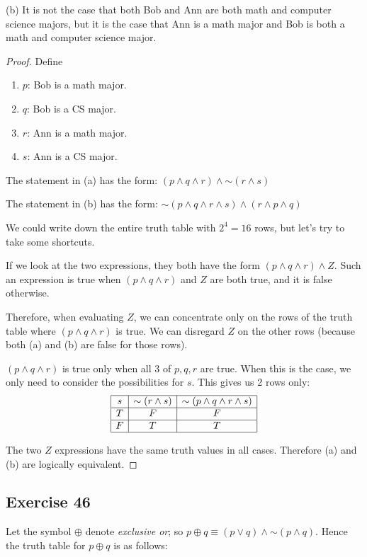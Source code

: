 \documentclass[14pt]{extarticle}
\begin{document}
(b) It is not the case that both Bob and Ann are both math and computer science majors, but it is the case that Ann is a math major and Bob is both a math and computer science major.

\begin{proof} Define
\begin{enumerate}
\item $p$: Bob is a math major.
\item $q$: Bob is a CS major.
\item $r$: Ann is a math major.
\item $s$: Ann is a CS major.
\end{enumerate}

The statement in (a) has the form: $(p \wedge q \wedge r) \wedge {\sim (r \wedge s)}$

The statement in (b) has the form: ${\sim (p \wedge q \wedge r \wedge s)} \wedge (r \wedge p \wedge q)$

We could write down the entire truth table with $2^4 = 16$ rows, but let's try to take some shortcuts.

If we look at the two expressions, they both have the form $(p \wedge q \wedge r) \wedge Z$. Such an expression is true when $(p \wedge q \wedge r)$ and $Z$ are both true, and it is false otherwise.

Therefore, when evaluating $Z$, we can concentrate only on the rows of the truth table where $(p \wedge q \wedge r)$ is true. We can disregard $Z$ on the other rows (because both (a) and (b) are false for those rows).

$(p \wedge q \wedge r)$ is true only when all 3 of $p, q, r$ are true. When this is the case, we only need to consider the possibilities for $s$. This gives us 2 rows only:
$$
\begin{array}{|c|c|c|}
\hline
s & {\sim (r \wedge s)} & {\sim (p \wedge q \wedge r \wedge s)} \\
\hline
T & F & F \\
\hline
F & T & T \\
\hline
\end{array}
$$

The two $Z$ expressions have the same truth values in all cases. Therefore (a) and (b) are logically equivalent.
\end{proof}

\subsection{Exercise 46}
Let the symbol $\oplus$ denote {\it exclusive or}; so $p \oplus q \equiv (p \vee q) \wedge {\sim(p \wedge q)}$. Hence the truth table for $p \oplus q$ is as follows:
\end{document}
